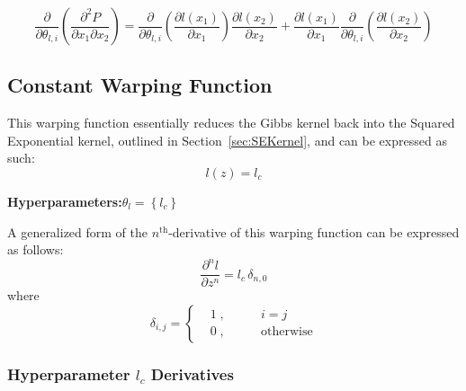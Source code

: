 \documentclass{article}
\begin{document}
\begin{equation}
\label{eq:GGKernel_did2PS}
	\frac{\partial}{\partial \theta_{l,i}}\!\left(\frac{\partial^2 P}{\partial x_1 \partial x_2}\right) = \frac{\partial}{\partial \theta_{l,i}}\!\left(\frac{\partial l\!\left(x_1\right)}{\partial x_1}\right) \frac{\partial l\!\left(x_2\right)}{\partial x_2} + \frac{\partial l\!\left(x_1\right)}{\partial x_1} \frac{\partial}{\partial \theta_{l,i}}\!\left(\frac{\partial l\!\left(x_2\right)}{\partial x_2}\right)
\end{equation}


\subsection{Constant Warping Function}
\label{subsec:GGKernel_C}

This warping function essentially reduces the Gibbs kernel back into the Squared Exponential kernel, outlined in Section~\ref{sec:SEKernel}, and can be expressed as such:
\begin{equation}
\label{eq:GGKernel_C}
	l\!\left(z\right) = l_c
\end{equation}

\begin{center}
	\textbf{Hyperparameters:}\hspace{20pt}$\theta_l = \left\lbrace l_c \right\rbrace$
\end{center}

A generalized form of the $n^{\text{th}}$-derivative of this warping function can be expressed as follows:
\begin{equation}
\label{eq:GGKernel_C_dnx}
	\frac{\partial^n l}{\partial z^n} = l_c \, \delta_{n,0}
\end{equation}
where
\begin{equation}
\label{eq:KroneckerDelta}
	\delta_{i,j} = \left\{
	\begin{aligned}
	&1 \; , \qquad &i = j \\
	&0 \; , \qquad &\text{otherwise}
	\end{aligned}
	\right.
\end{equation}

\subsubsection{Hyperparameter $l_c$ Derivatives}
\label{subsubsec:GG_CHypDer_l}
\end{document}
